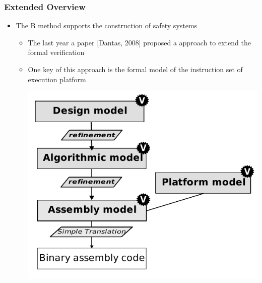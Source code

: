 \begin{frame}
\frametitle{Extended Overview}  

\begin{itemize}[<+->]
  \item The B method supports the construction of safety systems
  \begin{itemize}
    \item The last year a paper [Dantas, 2008] proposed a approach to extend the formal verification
    \item One key of this approach is the formal model of the instruction set  of execution platform %
      \\ \begin{center} \includegraphics[height=.5\textheight]{figures/b-method-ideal_new.pdf} \end{center}
  \end{itemize}

\end{itemize}

\end{frame}


